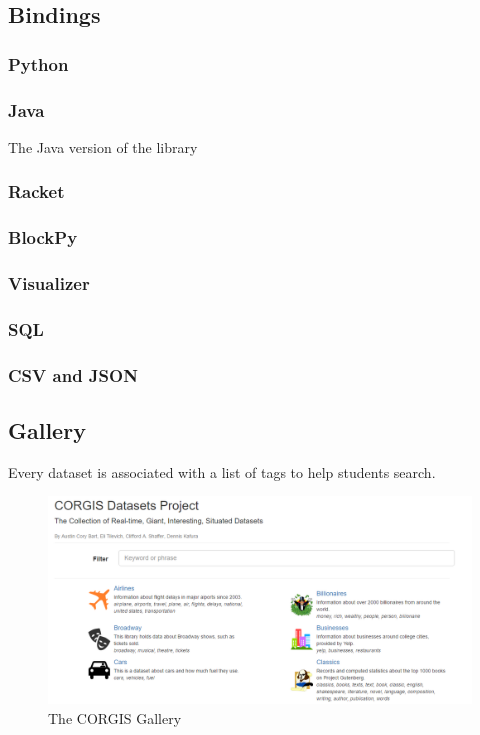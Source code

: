 \documentclass{sig-alternate}
\begin{document}
\subsection{Bindings}

\subsubsection{Python}


\subsubsection{Java}

The Java version of the library 

\subsubsection{Racket}
\subsubsection{BlockPy}
\subsubsection{Visualizer}
\subsubsection{SQL}
\subsubsection{CSV and JSON}

\subsection{Gallery}

Every dataset is associated with a list of tags to help students search.

\begin{figure}[h]
    \centering
    \includegraphics[width=.5\textwidth]{graphics/gallery}
    \caption{The CORGIS Gallery}
    \label{fig:corgis-gallery}
\end{figure}
\end{document}
